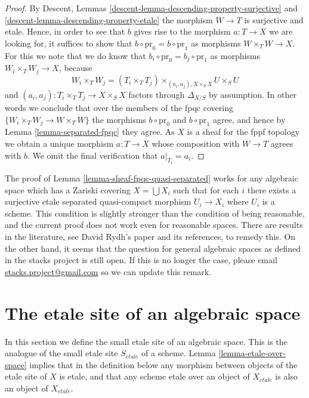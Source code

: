 \begin{proof}
\medskip\noindent
By
Descent, Lemmas \ref{descent-lemma-descending-property-surjective}
and \ref{descent-lemma-descending-property-etale}
the morphism $W \to T$ is surjective and etale. Hence, in order to see
that $b$ gives rise to the morphism $a : T \to X$ we are looking for,
it suffices to show that $b \circ \text{pr}_0 = b \circ \text{pr}_1$
as morphisms $W \times_T W \to X$. For this we note that we do know
that $b_i \circ \text{pr}_0 = b_j \circ \text{pr}_1$ as morphisms
$W_i \times_T W_j \to X$, because
$$
W_i \times_T W_j = (T_i \times_T T_j)
\times_{(a_i, a_j), X \times_S X} U \times_S U
$$
and $(a_i, a_j) : T_i \times_T T_j \to X \times_S X$ factors
through $\Delta_{X/S}$ by assumption. In other words we conclude that
over the members of the fpqc covering $\{W_i \times_T W_j \to W \times_T W\}$
the morphisms $b \circ \text{pr}_0$ and $b \circ \text{pr}_1$ agree,
and hence by
Lemma \ref{lemma-separated-fpqc}
they agree. As $X$ is a sheaf for the fppf topology we obtain a unique
morphism $a : T \to X$ whose composition with $W \to T$ agrees with $b$.
We omit the final verification that $a|_{T_i} = a_i$.
\end{proof}

\begin{remark}
\label{remark-proof-works-when}
The proof of
Lemma \ref{lemma-sheaf-fpqc-quasi-separated}
works for any algebraic space which has a
Zariski covering $X = \bigcup X_i$ such that for each $i$ there exists
a surjective etale separated quasi-compact morphism $U_i \to X_i$
where $U_i$ is a scheme. This condition is slightly stronger than the
condition of being reasonable, and the current proof does not work
even for reasonable spaces. There are results in the literature, see
David Rydh's paper \cite{rydh_descent} and its references, to remedy this.
On the other hand, it seems that the question for general algebraic spaces
as defined in the stacks project is still open. If this is no longer the
case, please email
\href{mailto:stacks.project@gmail.com}{stacks.project@gmail.com}
so we can update this remark.
\end{remark}








\section{The etale site of an algebraic space}
\label{section-etale-site}

\noindent
In this section we define the small etale site of an algebraic space.
This is the analogue of the small etale site $S_{etale}$ of a scheme.
Lemma \ref{lemma-etale-over-space} implies that in the definition below
any morphism between objects of the etale site of $X$ is etale, and that
any scheme etale over an object of $X_{etale}$ is also an object of
$X_{etale}$.

